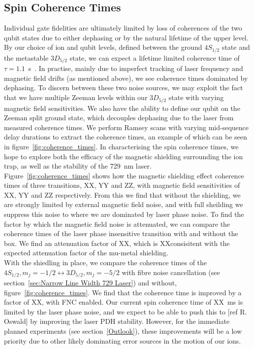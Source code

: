 \documentclass[12pt]{report}
\begin{document}
\subsection{Spin Coherence Times}
    Individual gate fidelities are ultimately limited by loss of coherences of
    the two qubit states due to either dephasing or by the natural lifetime of the upper level. By our choice of ion and qubit levels, defined between
    the ground $4S_{1/2}$ state and the metastable $3D_{5/2}$ state, we can
    expect a lifetime limited coherence time of $\tau = 1.1$~s~\cite{}. 
    In practise, mainly due to imperfect tracking of laser frequency and
    magnetic field drifts (as mentioned above), we see coherence times dominated
    by dephasing. To discern between these two noise sources, we may exploit the
    fact that we have multiple Zeeman levels within our $3D_{5/2}$ state with
    varying magnetic field sensitivities. We also have the ability to define our
    qubit on the Zeeman split ground state, which decouples dephasing due to the
    laser from measured coherence times. We perform Ramsey scans with varying
    mid-sequence delay durations to extract the coherence times, an example of
    which can be seen in figure~\ref{fig:coherence_times}. In characterising the
    spin coherence times, we hope to explore both the efficacy of the magnetic
    shielding surrounding the ion trap, as well as the stability of the 729~nm
    laser. \\
    Figure~\ref{fig:coherence_times} shows how the magnetic shielding effect
    coherence times of three transitions, XX, YY and ZZ, with magnetic field
    sensitivities of XX, YY and ZZ respectively.  From this we find that without
    the shielding, we are strongly limited by external magnetic field noise, and
    with full sheilding we suppress this noise to where we are dominated by
    laser phase noise. To find the factor by which the magnetic field noise is
    attenuated, we can compare the coherence times of the laser phase
    insensitive transition with and without the box. We find an attenuation
    factor of XX, which is XXconsisitent with the expected attenuation factor of
    the mu-metal shielding.\\
    With the shiedling in place, we compare the coherence times of the
    $4S_{1/2}, m_j = -1/2 \leftrightarrow 3D_{5/2}, m_j = -5/2$ with fibre noise cancellation (see
    section~\ref{sec:Narrow Line Width 729 Laser}) and without, figure~\ref{fig:coherence_times}. We find that the
    coherence time is improved by a factor of XX, with FNC enabled. Our current
    spin coherence time of XX~ms is limited by the laser phase noise, and we
    expect to be able to push this to [ref R. Oswald] by improving the laser PDH
    stability. However, for the immediate planned experiments (see
    section~\ref{Outlook}), these improvements will be a low priority due to
    other likely dominating error sources in the motion of our ions.\\
\end{document}
